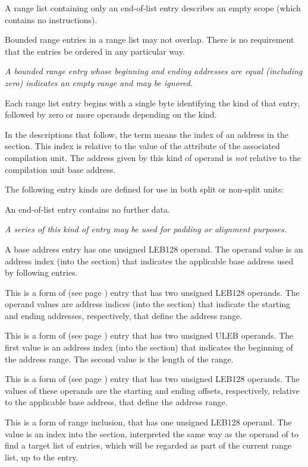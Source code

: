 A range list containing only an end-of-list entry describes an
empty scope (which contains no instructions).

Bounded range entries in a range list may not overlap. There is
no requirement that the entries be ordered in any particular way.

\textit{
\bb
A bounded range entry whose beginning and ending addresses
\db
are equal (including zero) indicates an empty range and may be
\eb
ignored.}

Each range list entry begins with a single byte identifying the kind
of that entry, followed by zero or more operands depending on the
kind.

In the descriptions that follow, the term 
means the index of an address in the \dotdebugaddr{} section. This
index is relative to the value of the \DWATaddrbase{} attribute
of the associated compilation unit. The address given by this kind
of operand is \emph{not} relative to the compilation unit base
address.

The following entry kinds are defined for use in both
split or non-split units:
\begin{enumerate}[1. ]
\itembfnl{\DWRLEendoflistTARG}
An end-of-list entry contains no further data.

\textit{A series of this kind of entry may be used for padding or
alignment purposes.}

\itembfnl{\DWRLEbaseaddressxTARG}
A base address entry has one unsigned LEB128 operand.
The operand value is an address index (into the \dotdebugaddr{}
section) that indicates the applicable base address used by
following \DWRLEoffsetpair{} entries.

\itembfnl{\DWRLEstartxendxTARG}
This is a form of 
\bb
(see page \pageref{text:bndrng})
\eb
entry that has two unsigned LEB128 operands. The operand values are
address indices (into the \dotdebugaddr{} section) that indicate the
starting and ending addresses, respectively, that define
the address range.

\itembfnl{\DWRLEstartxlengthTARG}
This is a form of 
\bb
(see page \pageref{text:bndrng})
\eb
entry that has two unsigned ULEB operands. The first value is an address index
(into the \dotdebugaddr{} section) that indicates the beginning of
the address range. The second value is the length of the range.

\itembfnl{\DWRLEoffsetpairTARG}
This is a form of 
\bb
(see page \pageref{text:bndrng})
\eb
entry that has two unsigned LEB128 operands. The values of these
operands are the starting and ending offsets, respectively,
relative to the applicable base address, that define the
address range.

\bb
\itembfnl{\DWRLEincludernglistxTARG}
This is a form of range inclusion, that has one unsigned LEB128
operand.  The value is an index into the \dotdebugrnglists{} section,
interpreted the same way as the operand of \DWFORMrnglistx{} to find
a target list of entries, which will be regarded as part of the
current range list, up to the \DWRLEendoflist{} entry.
\eb

\end{enumerate}

